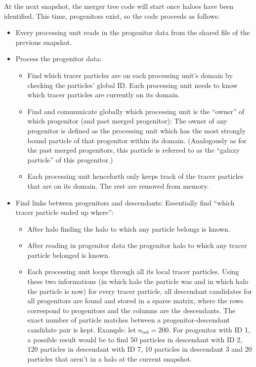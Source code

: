 \begin{appendices}
\begin{itemize}
\end{itemize}



At the next snapshot, the merger tree code will start once haloes have been identified.
This time, progenitors exist, so the code proceeds as follows:

\begin{itemize}
	
	\item Every processing unit reads in the progenitor data from the shared file of the previous snapshot.
	
	\item Process the progenitor data:
	\begin{itemize}
		\item Find which tracer particles are on each processing unit's domain by checking the particles' global ID.
		Each processing unit needs to know which tracer particles are currently on its domain.
		
		\item Find and communicate globally which processing unit is the ``owner'' of which progenitor (and past merged progenitor): 
		The owner of any progenitor is defined as the processing unit which has the most strongly bound particle of that progenitor within its domain.
		(Analogously as for the past merged progenitors, this particle is referred to as the ``galaxy particle'' of this progenitor.)
		
		\item Each processing unit henceforth only keeps track of the tracer particles that are on its domain.
		The rest are removed from memory.
	\end{itemize}
	
	\item Find links between progenitors and descendants: Essentially find ``which tracer particle ended up where'':
	
	\begin{itemize}
		\item After halo finding the halo to which any particle belongs is known.
		
		\item After reading in progenitor data the progenitor halo to which any tracer particle belonged is known.
		
		\item Each processing unit loops through all its local tracer particles.
		Using these two informations (in which halo the particle was and in which halo the particle is now) for every tracer particle, all descendant candidates for all progenitors are found and stored in a sparse matrix, where the rows correspond to progenitors and the columns are the descendants.
		The exact number of particle matches between a progenitor-descendant candidate pair is kept.
		Example: let $n_{mb}=200$. For progenitor with ID 1, a possible result would be to find 50 particles in descendant with ID 2, 120 particles in descendant with ID 7, 10 particles in descendant 3 and 20 particles that aren't in a halo at the current snapshot.
		

\end{itemize}
\end{itemize}
\end{appendices}

